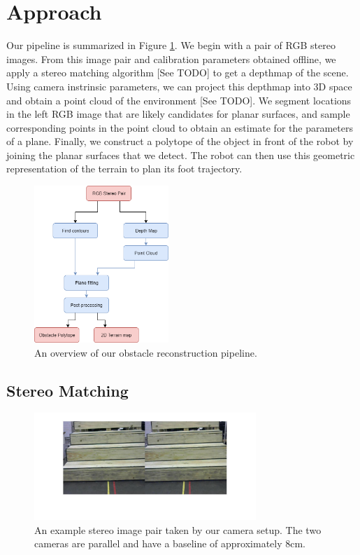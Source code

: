 
\section{Approach}

Our pipeline is summarized in Figure \ref{overview-diagram}. We begin with a pair of RGB stereo images. From this image pair and calibration parameters obtained offline, we apply a stereo matching algorithm [See TODO] to get a depthmap of the scene. Using camera instrinsic parameters, we can project this depthmap into 3D space and obtain a point cloud of the environment [See TODO]. We segment locations in the left RGB image that are likely candidates for planar surfaces, and sample corresponding points in the point cloud to obtain an estimate for the parameters of a plane. Finally, we construct a polytope of the object in front of the robot by joining the planar surfaces that we detect. The robot can then use this geometric representation of the terrain to plan its foot trajectory.


\begin{figure}[!h]
\centering
\includegraphics[width=2in]{Sections/Figures/Final-Project-Pipeline.png}
\caption{An overview of our obstacle reconstruction pipeline.}
\label{overview-diagram}
\end{figure}

\subsection{Stereo Matching}

\begin{figure}[!h]
\centering
\includegraphics[width=3.3in]{Sections/Figures/example_stereo_pair.jpg}
\caption{An example stereo image pair taken by our camera setup. The two cameras are parallel and have a baseline of approximately 8cm.}
\label{stereo-image-pair}
\end{figure}

